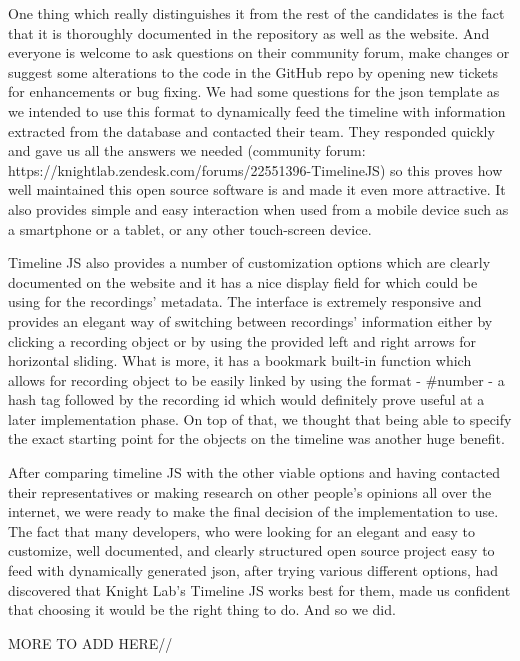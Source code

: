 \documentclass{l3proj}
\begin{document}
One thing which really distinguishes it from the rest of the candidates is the fact that it is thoroughly documented in the repository as well as the website. And everyone is welcome to ask questions on their community forum, make changes or suggest some alterations to the code in the GitHub repo by opening new tickets for enhancements or bug fixing. We had some questions for the json template as we intended to use this format to dynamically feed the timeline with information extracted from the database and contacted their team. They responded quickly and gave us all the answers we needed (community forum: https://knightlab.zendesk.com/forums/22551396-TimelineJS) so this proves how well maintained this open source software is and made it even more attractive. It also provides simple and easy interaction when used from a mobile device such as a smartphone or a tablet, or any other touch-screen device.

Timeline JS also provides a number of customization options which are clearly documented on the website and it has a nice display field for which could be using for the recordings’ metadata. The interface is extremely responsive and provides an elegant way of switching between recordings’ information either by clicking a recording object or by using the provided left and right arrows for horizontal sliding. What is more, it has a bookmark built-in function which allows for recording object to be easily linked by using the format - #number - a hash tag followed by the recording id which would definitely prove useful at a later implementation phase. On top of that, we thought that being able to specify the exact starting point for the objects on the timeline was another huge benefit.

After comparing timeline JS with the other viable options and having contacted their representatives or making research on other people’s opinions all over the internet, we were ready to make the final decision of the implementation to use. The fact that many developers, who were looking for an elegant and easy to customize, well documented, and clearly structured open source project easy to feed with dynamically generated json, after trying various different options, had discovered that Knight Lab’s Timeline JS works best for them, made us confident that choosing it would be the right thing to do. And so we did.

MORE TO ADD HERE//



\end{document}

